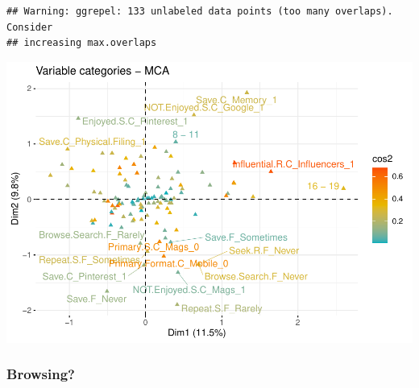 \documentclass[
]{article}
\newenvironment{Shaded}{\begin{snugshade}}{\end{snugshade}}
\newcommand{\DataTypeTok}[1]{\textcolor[rgb]{0.13,0.29,0.53}{#1}}
\newcommand{\KeywordTok}[1]{\textcolor[rgb]{0.13,0.29,0.53}{\textbf{#1}}}
\newcommand{\NormalTok}[1]{#1}
\newcommand{\OtherTok}[1]{\textcolor[rgb]{0.56,0.35,0.01}{#1}}
\newcommand{\StringTok}[1]{\textcolor[rgb]{0.31,0.60,0.02}{#1}}
\begin{document}
\begin{Shaded}
\end{Shaded}

\begin{verbatim}
## Warning: ggrepel: 133 unlabeled data points (too many overlaps). Consider
## increasing max.overlaps
\end{verbatim}

\includegraphics{Average-User-MCA_files/figure-latex/diet no search-3.pdf}

\hypertarget{browsing-1}{%
\subsubsection{Browsing?}\label{browsing-1}}
\end{document}
